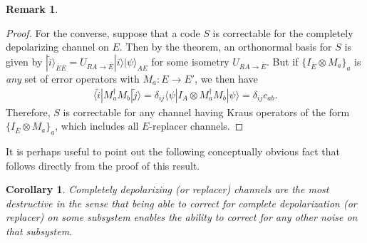\documentclass[11pt]{amsart}
\newtheorem{cor}[thm]{Corollary}
\theoremstyle{definition}
\theoremstyle{definition}
\theoremstyle{definition}
\newtheorem{remark}[thm]{Remark}
\newcommand{\1}{\mathbb{I}}
\newcommand{\wt}{\widetilde}
\def\ket#1{| #1 \rangle}
\def\bra#1{\langle #1 |}
\begin{document}
\begin{remark}
\begin{proof}
For the converse, suppose that a code $S$ is correctable for the completely depolarizing channel on $E$.  Then by the theorem, an orthonormal basis for $S$ is given by  $\ket{\wt{i}}_{\overline{E}E}=U_{RA\to\overline{E}}\ket{i}\ket{\psi}_{AE}$ for some isometry $U_{RA\to \overline{E}}$.  But if $\{I_{\overline{E}}\otimes M_a\}_a$ is \textit{any} set of error operators with $M_a:E\to E'$, we then have
\begin{align}
    \bra{\wt{i}}M_a^\dagger M_b\ket{\wt{j}}=\delta_{ij}\bra{\psi} I_A\otimes M_a^\dagger M_b\ket{\psi}=\delta_{ij}c_{ab}.
\end{align}
Therefore, $S$ is correctable for any channel having Kraus operators of the form $\{I_{\overline{E}}\otimes M_a\}_a$, which includes all $E$-replacer channels.
\end{proof}

It is perhaps useful to point out the following conceptually obvious fact that follows directly from the proof of this result. 

\begin{cor}
    Completely depolarizing (or replacer) channels are the most destructive in the sense that being able to correct for complete depolarization (or replacer) on some subsystem enables the ability to correct for any other noise on that subsystem.
\end{cor}


\end{remark}
\end{document}
